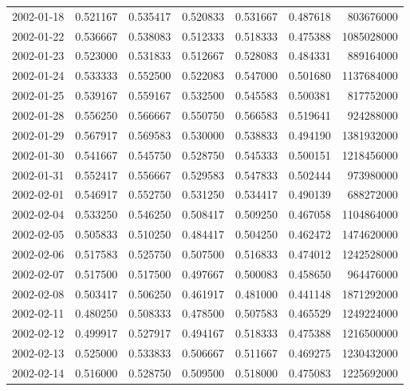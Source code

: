 \begin{tabular}{lrrrrrr}
2002-01-18 &    0.521167 &    0.535417 &    0.520833 &    0.531667 &    0.487618 &   803676000 \\
2002-01-22 &    0.536667 &    0.538083 &    0.512333 &    0.518333 &    0.475388 &  1085028000 \\
2002-01-23 &    0.523000 &    0.531833 &    0.512667 &    0.528083 &    0.484331 &   889164000 \\
2002-01-24 &    0.533333 &    0.552500 &    0.522083 &    0.547000 &    0.501680 &  1137684000 \\
2002-01-25 &    0.539167 &    0.559167 &    0.532500 &    0.545583 &    0.500381 &   817752000 \\
2002-01-28 &    0.556250 &    0.566667 &    0.550750 &    0.566583 &    0.519641 &   924288000 \\
2002-01-29 &    0.567917 &    0.569583 &    0.530000 &    0.538833 &    0.494190 &  1381932000 \\
2002-01-30 &    0.541667 &    0.545750 &    0.528750 &    0.545333 &    0.500151 &  1218456000 \\
2002-01-31 &    0.552417 &    0.556667 &    0.529583 &    0.547833 &    0.502444 &   973980000 \\
2002-02-01 &    0.546917 &    0.552750 &    0.531250 &    0.534417 &    0.490139 &   688272000 \\
2002-02-04 &    0.533250 &    0.546250 &    0.508417 &    0.509250 &    0.467058 &  1104864000 \\
2002-02-05 &    0.505833 &    0.510250 &    0.484417 &    0.504250 &    0.462472 &  1474620000 \\
2002-02-06 &    0.517583 &    0.525750 &    0.507500 &    0.516833 &    0.474012 &  1242528000 \\
2002-02-07 &    0.517500 &    0.517500 &    0.497667 &    0.500083 &    0.458650 &   964476000 \\
2002-02-08 &    0.503417 &    0.506250 &    0.461917 &    0.481000 &    0.441148 &  1871292000 \\
2002-02-11 &    0.480250 &    0.508333 &    0.478500 &    0.507583 &    0.465529 &  1249224000 \\
2002-02-12 &    0.499917 &    0.527917 &    0.494167 &    0.518333 &    0.475388 &  1216500000 \\
2002-02-13 &    0.525000 &    0.533833 &    0.506667 &    0.511667 &    0.469275 &  1230432000 \\
2002-02-14 &    0.516000 &    0.528750 &    0.509500 &    0.518000 &    0.475083 &  1225692000 \\

\end{tabular}
